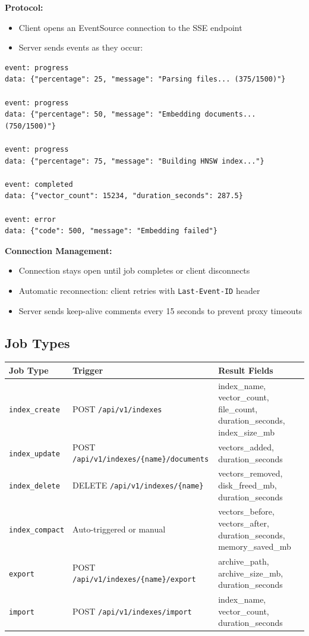 \documentclass[11pt,a4paper]{article}
\newcommand{\inlinecode}[1]{\texttt{\small\colorbox{ctCodeBg}{#1}}}
\newcommand{\apipath}[1]{\texttt{\small\textcolor{ctAccentBlue}{#1}}}
\begin{document}
\begin{endpointbox}
\textbf{Protocol:}
\begin{itemize}
    \item Client opens an EventSource connection to the SSE endpoint
    \item Server sends events as they occur:
\end{itemize}
\begin{lstlisting}[language={},title={SSE Event Stream}]
event: progress
data: {"percentage": 25, "message": "Parsing files... (375/1500)"}

event: progress
data: {"percentage": 50, "message": "Embedding documents... (750/1500)"}

event: progress
data: {"percentage": 75, "message": "Building HNSW index..."}

event: completed
data: {"vector_count": 15234, "duration_seconds": 287.5}

event: error
data: {"code": 500, "message": "Embedding failed"}
\end{lstlisting}

\textbf{Connection Management:}
\begin{itemize}
    \item Connection stays open until job completes or client disconnects
    \item Automatic reconnection: client retries with \inlinecode{Last-Event-ID} header
    \item Server sends keep-alive comments every 15 seconds to prevent proxy timeouts
\end{itemize}
\end{endpointbox}

\subsection{Job Types}

\begin{longtable}{@{}p{3cm}p{5cm}p{5.5cm}@{}}
\toprule
\textbf{Job Type} & \textbf{Trigger} & \textbf{Result Fields} \\
\midrule
\endhead
\inlinecode{index\_create} & POST \apipath{/api/v1/indexes} & index\_name, vector\_count, file\_count, duration\_seconds, index\_size\_mb \\
\inlinecode{index\_update} & POST \apipath{/api/v1/indexes/\{name\}/documents} & vectors\_added, duration\_seconds \\
\inlinecode{index\_delete} & DELETE \apipath{/api/v1/indexes/\{name\}} & vectors\_removed, disk\_freed\_mb, duration\_seconds \\
\inlinecode{index\_compact} & Auto-triggered or manual & vectors\_before, vectors\_after, duration\_seconds, memory\_saved\_mb \\
\inlinecode{export} & POST \apipath{/api/v1/indexes/\{name\}/export} & archive\_path, archive\_size\_mb, duration\_seconds \\
\inlinecode{import} & POST \apipath{/api/v1/indexes/import} & index\_name, vector\_count, duration\_seconds \\
\bottomrule
\end{longtable}
\end{document}
